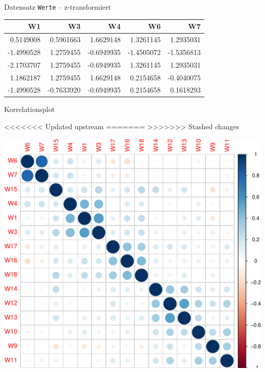 \begin{frame}{Datensatz \texttt{Werte} -- z-transformiert}

\begin{longtable}[]{@{}rrrrr@{}}
\toprule
W1 & W3 & W4 & W6 & W7\tabularnewline
\midrule
\endhead
0.5149008 & 0.5961663 & 1.6629148 & 1.3261145 & 1.2935031\tabularnewline
-1.4990528 & 1.2759455 & -0.6949935 & -1.4505072 &
-1.5356813\tabularnewline
-2.1703707 & 1.2759455 & -0.6949935 & 1.3261145 &
1.2935031\tabularnewline
1.1862187 & 1.2759455 & 1.6629148 & 0.2154658 &
-0.4040075\tabularnewline
-1.4990528 & -0.7633920 & -0.6949935 & 0.2154658 &
0.1618293\tabularnewline
\bottomrule
\end{longtable}

\end{frame}

\begin{frame}[fragile]{Korrelationsplot}

\begin{Shaded}
\begin{Highlighting}[]
<<<<<<< Updated upstream
\OperatorTok{::}\NormalTok{(} \NormalTok{)}
=======
\NormalTok{(} \NormalTok{)}
>>>>>>> Stashed changes
\end{Highlighting}
\end{Shaded}

\begin{center}\includegraphics[width=0.5\linewidth]{PraDa_Folien_nm_2_files/figure-beamer/unnamed-chunk-27-1} \end{center}

\end{frame}

